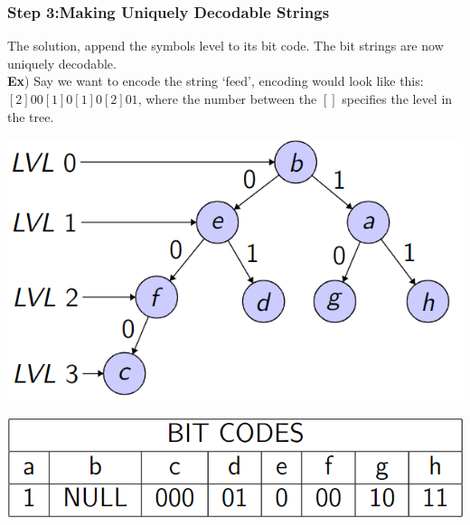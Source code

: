 \documentclass{beamer}
\begin{document}
\begin{frame}
    \frametitle{Step 3:Making Uniquely Decodable Strings}
The solution, append the symbols level to its bit code. The bit strings are now uniquely decodable.\\
\large\textbf{Ex}) Say we want to encode the string `feed',
encoding would look like this: $[2]00[1]0[1]0[2]01$, where the number between the $[]$ 
specifies the level in the tree.
\begin{center}
    \begin{minipage}{0.2\textwidth}
      \centering
      \includegraphics[scale=0.35]{images/bintree.png}
    \end{minipage}
    \hfill
    \begin{minipage}{0.4\textwidth}
      \centering
      \includegraphics[scale=.29]{images/bitcode.png}
    \end{minipage}
\end{center}
\end{frame}
\end{document}
